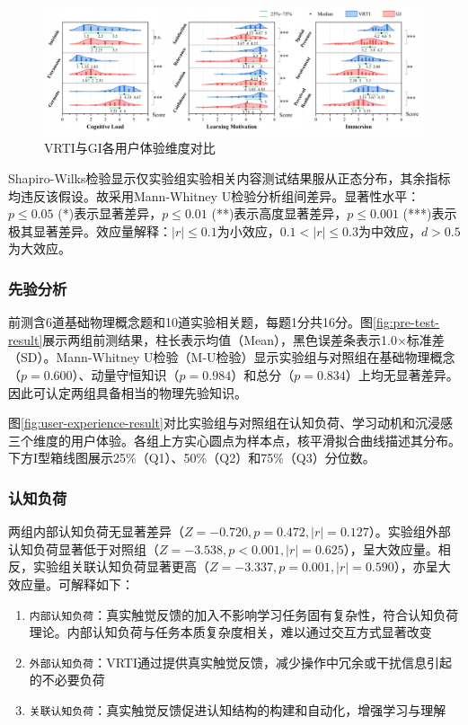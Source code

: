 \documentclass[runningheads]{llncs}
\begin{document}
\begin{figure}[t]
  \centering
  \includegraphics[width=\textwidth]{image/three-user-experience-result.pdf}
  \caption{VRTI与GI各用户体验维度对比}
  \label{fig:three-user-experience-result}
\end{figure}

Shapiro-Wilks检验显示仅实验组实验相关内容测试结果服从正态分布，其余指标均违反该假设。故采用Mann-Whitney U检验分析组间差异。显著性水平：$p \le 0.05$ (*)表示显著差异，$p \le 0.01$ (**)表示高度显著差异，$p \le 0.001$ (***)表示极其显著差异。效应量解释：$|r| \le 0.1$为小效应，$0.1 < |r| \le  0.3$为中效应，$d > 0.5$为大效应。

\subsubsection{先验分析}
前测含6道基础物理概念题和10道实验相关题，每题1分共16分。图\ref{fig:pre-test-result}展示两组前测结果，柱长表示均值（Mean），黑色误差条表示1.0×标准差（SD）。Mann-Whitney U检验（M-U检验）显示实验组与对照组在基础物理概念（$p=0.600$）、动量守恒知识（$p=0.984$）和总分（$p=0.834$）上均无显著差异。因此可认定两组具备相当的物理先验知识。

图\ref{fig:user-experience-result}对比实验组与对照组在认知负荷、学习动机和沉浸感三个维度的用户体验。各组上方实心圆点为样本点，核平滑拟合曲线描述其分布。下方I型箱线图展示25\%（Q1）、50\%（Q2）和75\%（Q3）分位数。

\subsubsection{认知负荷}
两组内部认知负荷无显著差异（$Z=-0.720, p=0.472, |r|=0.127$）。实验组外部认知负荷显著低于对照组（$Z=-3.538, p<0.001, |r|=0.625$），呈大效应量。相反，实验组关联认知负荷显著更高（$Z=-3.337, p=0.001, |r|=0.590$），亦呈大效应量。可解释如下：
\begin{enumerate}
\item {\texttt{内部认知负荷}}：真实触觉反馈的加入不影响学习任务固有复杂性，符合认知负荷理论。内部认知负荷与任务本质复杂度相关，难以通过交互方式显著改变
\item {\texttt{外部认知负荷}}：VRTI通过提供真实触觉反馈，减少操作中冗余或干扰信息引起的不必要负荷
\item {\texttt{关联认知负荷}}：真实触觉反馈促进认知结构的构建和自动化，增强学习与理解
\end{enumerate}
\end{document}
